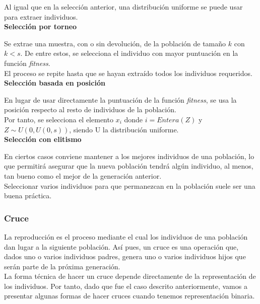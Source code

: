 			Al igual que en la selecci\'on anterior, una distribuci\'on uniforme se puede usar para extraer individuos.\\
			
			\textbf{Selecci\'on por torneo}
			
			Se extrae una muestra, con o sin devoluci\'on, de la poblaci\'on de tama\~no $k$ con $k<s$. De entre estos, se selecciona el individuo con mayor puntuaci\'on en la funci\'on \textit{fitness}.\\
			
			El proceso se repite hasta que se hayan extra\'ido todos los individuos requeridos.\\
			
			\textbf{Selecci\'on basada en posición}
			
			En lugar de usar directamente la puntuaci\'on de la funci\'on \textit{fitness}, se usa la posici\'on respecto al resto de individuos de la poblaci\'on.\\
			
			Por tanto, se selecciona el elemento $x_i$ donde $i=Entera(Z)$ y $Z\sim U(0,U(0,s))$, siendo U la distribuci\'on uniforme.\\
			
			\textbf{Selecci\'on con elitismo}
			
			En ciertos casos conviene mantener a los mejores individuos de una poblaci\'on, lo que permitir\'a asegurar que la nueva poblaci\'on tendr\'a alg\'un individuo, al menos, tan bueno como el mejor de la generaci\'on anterior.\\
			
			Seleccionar varios individuos para que permanezcan en la poblaci\'on suele ser una buena pr\'actica.\\
			
			\subsubsection{Cruce}
			
			La reproducci\'on es el proceso mediante el cual los individuos de una poblaci\'on dan lugar a la siguiente poblaci\'on. As\'i pues, un cruce es una operaci\'on que, dados uno o varios individuos padres, genera uno o varios individuos hijos que ser\'an parte de la pr\'oxima generaci\'on.\\
			
			La forma t\'ecnica de hacer un cruce depende directamente de la representaci\'on de los individuos. Por tanto, dado que fue el caso descrito anteriormente, vamos a presentar algunas formas de hacer cruces cuando tenemos representaci\'on binaria.\\
			
